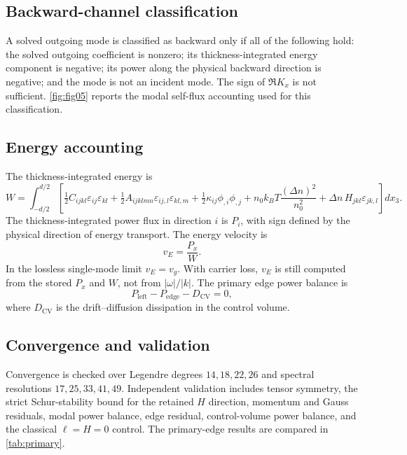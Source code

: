 \subsection{Backward-channel classification}
A solved outgoing mode is classified as backward only if all of the following hold:
the solved outgoing coefficient is nonzero; its thickness-integrated energy
component is negative; its power along the physical backward direction is negative;
and the mode is not an incident mode. The sign of \(\Re K_x\) is not sufficient.
\cref{fig:fig05} reports the modal self-flux accounting used for this classification.

\subsection{Energy accounting}
The thickness-integrated energy is
\[
W=\int_{-d/2}^{d/2}\left[
\tfrac12C_{ijkl}\varepsilon_{ij}\varepsilon_{kl}
+\tfrac12A_{ijklmn}\varepsilon_{ij,l}\varepsilon_{kl,m}
+\tfrac12\kappa_{ij}\phi_{,i}\phi_{,j}
+n_0k_BT\frac{(\Delta n)^2}{n_0^2}
+\Delta n\,H_{jkl}\varepsilon_{jk,l}
\right]dx_3.
\]
The thickness-integrated power flux in direction \(i\) is \(P_i\), with sign
defined by the physical direction of energy transport. The energy velocity is
\[
v_E=\frac{P_x}{W}.
\]
In the lossless single-mode limit \(v_E=v_g\). With carrier loss, \(v_E\) is still
computed from the stored \(P_x\) and \(W\), not from \(|\omega|/|k|\). The primary
edge power balance is
\[
P_{\mathrm{left}}-P_{\mathrm{edge}}-D_{\mathrm{CV}}=0,
\]
where \(D_{\mathrm{CV}}\) is the drift--diffusion dissipation in the control
volume.

\subsection{Convergence and validation}
Convergence is checked over Legendre degrees \(14,18,22,26\) and spectral
resolutions \(17,25,33,41,49\). Independent validation includes tensor symmetry,
the strict Schur-stability bound for the retained \(H\) direction, momentum and
Gauss residuals, modal power balance, edge residual, control-volume power balance,
and the classical \(\ell=H=0\) control. The primary-edge results are compared in
\cref{tab:primary}.
